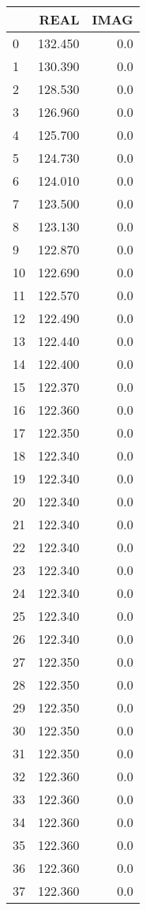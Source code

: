 \begin{tabular}{lrr}
\toprule
{} &     REAL &  IMAG \\
\midrule
0   &  132.450 &   0.0 \\
1   &  130.390 &   0.0 \\
2   &  128.530 &   0.0 \\
3   &  126.960 &   0.0 \\
4   &  125.700 &   0.0 \\
5   &  124.730 &   0.0 \\
6   &  124.010 &   0.0 \\
7   &  123.500 &   0.0 \\
8   &  123.130 &   0.0 \\
9   &  122.870 &   0.0 \\
10  &  122.690 &   0.0 \\
11  &  122.570 &   0.0 \\
12  &  122.490 &   0.0 \\
13  &  122.440 &   0.0 \\
14  &  122.400 &   0.0 \\
15  &  122.370 &   0.0 \\
16  &  122.360 &   0.0 \\
17  &  122.350 &   0.0 \\
18  &  122.340 &   0.0 \\
19  &  122.340 &   0.0 \\
20  &  122.340 &   0.0 \\
21  &  122.340 &   0.0 \\
22  &  122.340 &   0.0 \\
23  &  122.340 &   0.0 \\
24  &  122.340 &   0.0 \\
25  &  122.340 &   0.0 \\
26  &  122.340 &   0.0 \\
27  &  122.350 &   0.0 \\
28  &  122.350 &   0.0 \\
29  &  122.350 &   0.0 \\
30  &  122.350 &   0.0 \\
31  &  122.350 &   0.0 \\
32  &  122.360 &   0.0 \\
33  &  122.360 &   0.0 \\
34  &  122.360 &   0.0 \\
35  &  122.360 &   0.0 \\
36  &  122.360 &   0.0 \\
37  &  122.360 &   0.0 \\

\end{tabular}

